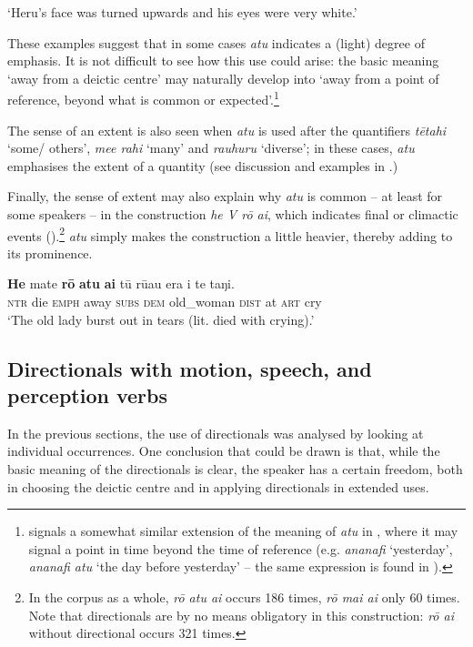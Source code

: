 \glt
‘Heru’s face was turned upwards and his eyes were very white.’ \textstyleExampleref{[R313.043]} 
\z

These examples suggest that in some cases \textit{atu} indicates a (light) degree of emphasis. It is not difficult to see how this use could arise: the basic meaning ‘away from a deictic centre’ may naturally develop into ‘away from a point of reference, beyond what is common or expected’.\footnote{\label{fn:358}\citet[291]{Hooper2002} signals a somewhat similar extension of the meaning of \textit{atu} in , where it may signal a point in time beyond the time of reference (e.g. \textit{ananafi} ‘yesterday’, \textit{ananafi atu} ‘the day before yesterday’ – the same expression is found in ).} 

The sense of an extent is also seen when \textit{atu} is used after the quantifiers \textit{\mbox{tētahi}} ‘some/ others’, \textit{me{\ꞌ}e rahi} ‘many’ and \textit{rauhuru} ‘diverse’; in these cases, \textit{atu} emphasises the extent of a quantity (see discussion and examples in .) 

Finally, the sense of extent may also explain why \textit{atu} is common – at least for some speakers – in the construction \textit{he V rō {\ꞌ}ai}, which indicates final or climactic events ().\footnote{\label{fn:359}In the corpus as a whole, \textit{rō atu {\ꞌ}ai} occurs 186 times, \textit{rō mai {\ꞌ}ai} only 60 times. Note that directionals are by no means obligatory in this construction: \textit{rō {\ꞌ}ai} without directional occurs 321 times.}  \textit{atu} simply makes the construction a little heavier, thereby adding to its prominence.

\ea\label{ex:7.151}
\gll \textbf{He} mate \textbf{rō} \textbf{atu} \textbf{{\ꞌ}ai} tū rū{\ꞌ}au era {\ꞌ}i te taŋi. \\
\textsc{ntr} die \textsc{emph} away \textsc{subs} \textsc{dem} old\_woman \textsc{dist} at \textsc{art} cry \\

\glt 
‘The old lady burst out in tears (lit. died with crying).’ \textstyleExampleref{[R313.104]} 
\z

\subsection{Directionals with motion, speech, and perception verbs}\label{sec:7.5.2}
In the previous sections, the use of directionals was analysed by looking at individual occurrences. One conclusion that could be drawn is that, while the basic meaning of the directionals is clear, the speaker has a certain freedom, both in choosing the deictic centre and in applying directionals in extended uses. 

